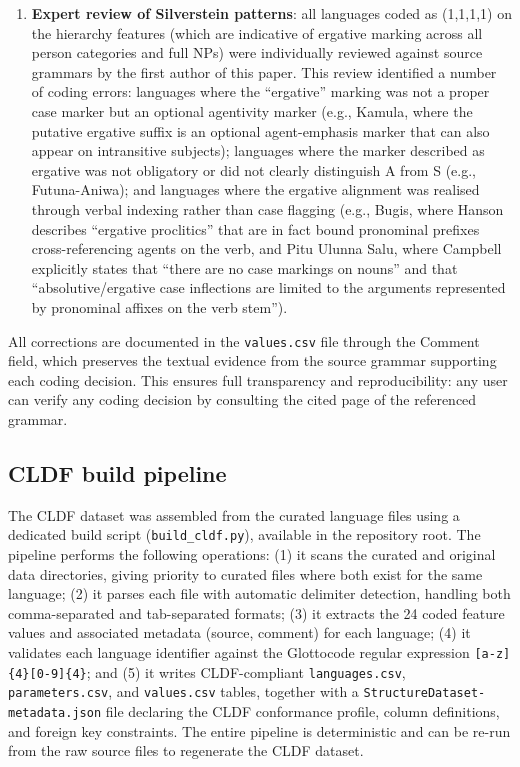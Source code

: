 \documentclass[12pt,a4paper]{article}
\begin{document}
\begin{enumerate}
\item \textbf{Expert review of Silverstein patterns}: all languages coded as (1,1,1,1) on the hierarchy features (which are indicative of ergative marking across all person categories and full NPs) were individually reviewed against source grammars by the first author of this paper. This review identified a number of coding errors: languages where the ``ergative'' marking was not a proper case marker but an optional agentivity marker (e.g., Kamula, where the putative ergative suffix is an optional agent-emphasis marker that can also appear on intransitive subjects); languages where the marker described as ergative was not obligatory or did not clearly distinguish A from S (e.g., Futuna-Aniwa); and languages where the ergative alignment was realised through verbal indexing rather than case flagging (e.g., Bugis, where Hanson \cite{hanson2003} describes ``ergative proclitics'' that are in fact bound pronominal prefixes cross-referencing agents on the verb, and Pitu Ulunna Salu, where Campbell \cite{campbell1989} explicitly states that ``there are no case markings on nouns'' and that ``absolutive/ergative case inflections are limited to the arguments represented by pronominal affixes on the verb stem'').
\end{enumerate}

All corrections are documented in the \texttt{values.csv} file through the Comment field, which preserves the textual evidence from the source grammar supporting each coding decision. This ensures full transparency and reproducibility: any user can verify any coding decision by consulting the cited page of the referenced grammar.

\subsection{CLDF build pipeline}

The CLDF dataset was assembled from the curated language files using a dedicated build script (\texttt{build\_cldf.py}), available in the repository root. The pipeline performs the following operations: (1) it scans the curated and original data directories, giving priority to curated files where both exist for the same language; (2) it parses each file with automatic delimiter detection, handling both comma-separated and tab-separated formats; (3) it extracts the 24 coded feature values and associated metadata (source, comment) for each language; (4) it validates each language identifier against the Glottocode regular expression \texttt{[a-z]\{4\}[0-9]\{4\}}; and (5) it writes CLDF-compliant \texttt{languages.csv}, \texttt{parameters.csv}, and \texttt{values.csv} tables, together with a \texttt{StructureDataset-metadata.json} file declaring the CLDF conformance profile, column definitions, and foreign key constraints. The entire pipeline is deterministic and can be re-run from the raw source files to regenerate the CLDF dataset.
\end{document}
